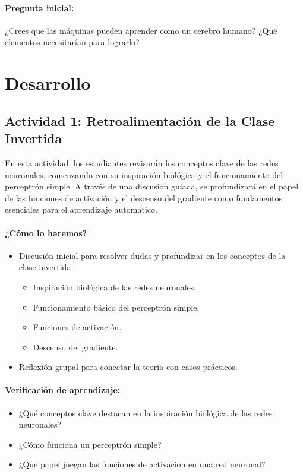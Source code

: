 \documentclass[a4,11pt]{aleph-notas}
\begin{document}
\paragraph{Pregunta inicial:} 
¿Crees que las máquinas pueden aprender como un cerebro humano? ¿Qué elementos necesitarían para lograrlo?

\section*{Desarrollo}

\subsection*{Actividad 1: Retroalimentación de la Clase Invertida}
En esta actividad, los estudiantes revisarán los conceptos clave de las redes neuronales, comenzando con su inspiración biológica y el funcionamiento del perceptrón simple. A través de una discusión guiada, se profundizará en el papel de las funciones de activación y el descenso del gradiente como fundamentos esenciales para el aprendizaje automático.

\paragraph{¿Cómo lo haremos?}  
\begin{itemize}[leftmargin=*]
    \item Discusión inicial para resolver dudas y profundizar en los conceptos de la clase invertida:
    \begin{itemize}
        \item Inspiración biológica de las redes neuronales.
        \item Funcionamiento básico del perceptrón simple.
        \item Funciones de activación.
        \item Descenso del gradiente.
    \end{itemize}
    \item Reflexión grupal para conectar la teoría con casos prácticos.
\end{itemize}

\paragraph{Verificación de aprendizaje:}  
\begin{itemize}[leftmargin=*]
    \item ¿Qué conceptos clave destacan en la inspiración biológica de las redes neuronales?
    \item ¿Cómo funciona un perceptrón simple?
    \item ¿Qué papel juegan las funciones de activación en una red neuronal?
\end{itemize}
\end{document}
